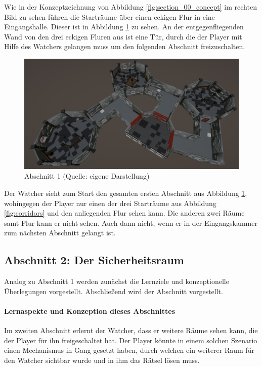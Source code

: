 Wie in der Konzeptzeichnung von Abbildung \ref{fig:section_00_concept} im rechten Bild zu sehen führen die Starträume über einen eckigen Flur in eine Eingangshalle. Dieser ist in Abbildung \ref{fig:section_00} zu sehen. An der entgegenfliegenden Wand von den drei eckigen Fluren aus ist eine Tür, durch die der Player mit Hilfe des Watchers gelangen muss um den folgenden Abschnitt freizuschalten. 

\begin{figure}[ht]
\centering
\includegraphics[width=1\linewidth]{content/pictures/Abschnitt_00.PNG}
\caption{Abschnitt 1 (Quelle: eigene Darstellung)}
\label{fig:section_00}
\end{figure}

Der Watcher sieht zum Start den gesamten ersten Abschnitt aus Abbildung \ref{fig:section_00}, wohingegen der Player nur einen der drei Starträume aus Abbildung \ref{fig:corridors} und den anliegenden Flur sehen kann. Die anderen zwei Räume samt Flur kann er nicht sehen. Auch dann nicht, wenn er in der Eingangskammer zum nächsten Abschnitt gelangt ist.


\subsection{Abschnitt 2: Der Sicherheitsraum}
Analog zu Abschnitt 1 werden zunächst die Lernziele und konzeptionelle Überlegungen vorgestellt. Abschließend wird der Abschnitt vorgestellt.

\paragraph{Lernaspekte und Konzeption dieses Abschnittes}
Im zweiten Abschnitt erlernt der Watcher, dass er weitere Räume sehen kann, die der Player für ihn freigeschaltet hat. Der Player könnte in einem solchen Szenario einen Mechanismus in Gang gesetzt haben, durch welchen ein weiterer Raum für den Watcher sichtbar wurde und in ihm das Rätsel lösen muss.

